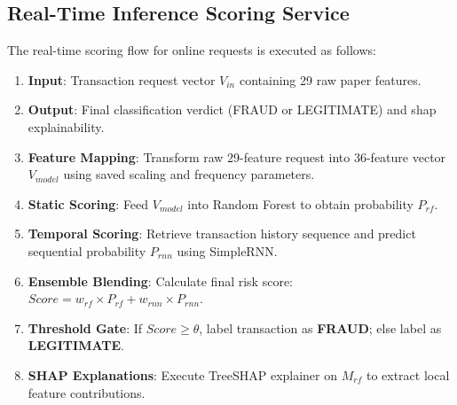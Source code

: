 \subsection{Real-Time Inference Scoring Service}
The real-time scoring flow for online requests is executed as follows:
\begin{enumerate}
    \item \textbf{Input}: Transaction request vector $V_{in}$ containing 29 raw paper features.
    \item \textbf{Output}: Final classification verdict (FRAUD or LEGITIMATE) and \gls{shap} explainability.
    \item \textbf{Feature Mapping}: Transform raw 29-feature request into 36-feature vector $V_{model}$ using saved scaling and frequency parameters.
    \item \textbf{Static Scoring}: Feed $V_{model}$ into Random Forest to obtain probability $P_{rf}$.
    \item \textbf{Temporal Scoring}: Retrieve transaction history sequence and predict sequential probability $P_{rnn}$ using SimpleRNN.
    \item \textbf{Ensemble Blending}: Calculate final risk score: $Score = w_{rf} \times P_{rf} + w_{rnn} \times P_{rnn}$.
    \item \textbf{Threshold Gate}: If $Score \ge \theta$, label transaction as \textbf{FRAUD}; else label as \textbf{LEGITIMATE}.
    \item \textbf{SHAP Explanations}: Execute TreeSHAP explainer on $M_{rf}$ to extract local feature contributions.
\end{enumerate}
